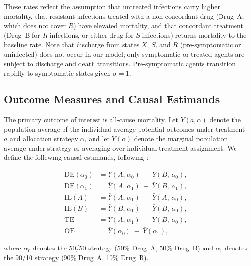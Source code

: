 \documentclass[preprint,11pt]{elsarticle}
\begin{document}
These rates reflect the assumption that untreated infections carry higher mortality, that resistant infections treated with a non-concordant drug (Drug~A, which does not cover $R$) have elevated mortality, and that concordant treatment (Drug~B for $R$ infections, or either drug for $S$ infections) returns mortality to the baseline rate. Note that discharge from states $X$, $S$, and $R$ (pre-symptomatic or uninfected) does not occur in our model; only symptomatic or treated agents are subject to discharge and death transitions. Pre-symptomatic agents transition rapidly to symptomatic states given $\sigma = 1$.

\subsection{Outcome Measures and Causal Estimands}

The primary outcome of interest is all-cause mortality. Let $\bar{Y}(a, \alpha)$ denote the population average of the individual average potential outcomes under treatment $a$ and allocation strategy $\alpha$, and let $\bar{Y}(\alpha)$ denote the marginal population average under strategy $\alpha$, averaging over individual treatment assignment. We define the following causal estimands, following \citet{hudgens_toward_2008}:

\begin{align}
\mathrm{DE}(\alpha_0) &= \bar{Y}(A,\, \alpha_0) \;-\; \bar{Y}(B,\, \alpha_0), \label{eq:de0}\\[4pt]
\mathrm{DE}(\alpha_1) &= \bar{Y}(A,\, \alpha_1) \;-\; \bar{Y}(B,\, \alpha_1), \label{eq:de1}\\[4pt]
\mathrm{IE}(A) &= \bar{Y}(A,\, \alpha_1) \;-\; \bar{Y}(A,\, \alpha_0), \label{eq:iea}\\[4pt]
\mathrm{IE}(B) &= \bar{Y}(B,\, \alpha_1) \;-\; \bar{Y}(B,\, \alpha_0), \label{eq:ieb}\\[4pt]
\mathrm{TE} &= \bar{Y}(A,\, \alpha_1) \;-\; \bar{Y}(B,\, \alpha_0), \label{eq:te}\\[4pt]
\mathrm{OE} &= \bar{Y}(\alpha_0) \;-\; \bar{Y}(\alpha_1), \label{eq:oe}
\end{align}

where $\alpha_0$ denotes the 50/50 strategy (50\% Drug~A, 50\% Drug~B) and $\alpha_1$ denotes the 90/10 strategy (90\% Drug~A, 10\% Drug~B).
\end{document}
